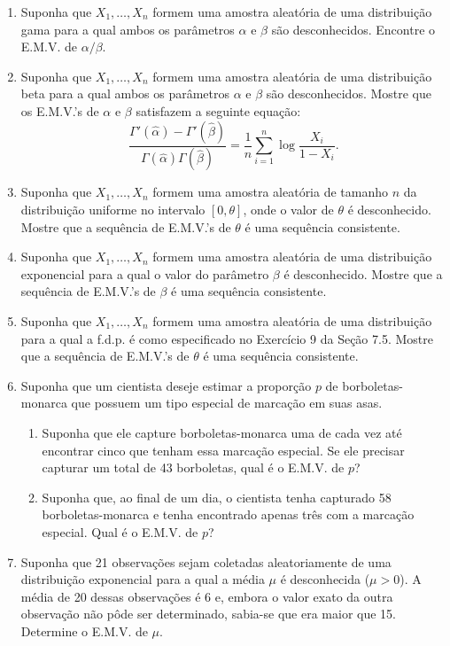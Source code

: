 \begin{enumerate}
    \item Suponha que $X_1, \dots, X_n$ formem uma amostra aleatória de uma distribuição gama para a qual ambos os parâmetros $\alpha$ e $\beta$ são desconhecidos. Encontre o E.M.V. de $\alpha/\beta$.
    
    \item Suponha que $X_1, \dots, X_n$ formem uma amostra aleatória de uma distribuição beta para a qual ambos os parâmetros $\alpha$ e $\beta$ são desconhecidos. Mostre que os E.M.V.'s de $\alpha$ e $\beta$ satisfazem a seguinte equação:
    $$ \frac{\Gamma'(\hat{\alpha}) - \Gamma'(\hat{\beta})}{\Gamma(\hat{\alpha})\Gamma(\hat{\beta})} = \frac{1}{n}\sum_{i=1}^{n} \log\frac{X_i}{1-X_i}. $$
    
    \item Suponha que $X_1, \dots, X_n$ formem uma amostra aleatória de tamanho $n$ da distribuição uniforme no intervalo $[0, \theta]$, onde o valor de $\theta$ é desconhecido. Mostre que a sequência de E.M.V.'s de $\theta$ é uma sequência consistente.
    
    \item Suponha que $X_1, \dots, X_n$ formem uma amostra aleatória de uma distribuição exponencial para a qual o valor do parâmetro $\beta$ é desconhecido. Mostre que a sequência de E.M.V.'s de $\beta$ é uma sequência consistente.
    
    \item Suponha que $X_1, \dots, X_n$ formem uma amostra aleatória de uma distribuição para a qual a f.d.p. é como especificado no Exercício 9 da Seção 7.5. Mostre que a sequência de E.M.V.'s de $\theta$ é uma sequência consistente.
    
    \item Suponha que um cientista deseje estimar a proporção $p$ de borboletas-monarca que possuem um tipo especial de marcação em suas asas.
    \begin{enumerate}
        \item Suponha que ele capture borboletas-monarca uma de cada vez até encontrar cinco que tenham essa marcação especial. Se ele precisar capturar um total de 43 borboletas, qual é o E.M.V. de $p$?
        \item Suponha que, ao final de um dia, o cientista tenha capturado 58 borboletas-monarca e tenha encontrado apenas três com a marcação especial. Qual é o E.M.V. de $p$?
    \end{enumerate}
    
    \item Suponha que 21 observações sejam coletadas aleatoriamente de uma distribuição exponencial para a qual a média $\mu$ é desconhecida ($\mu > 0$). A média de 20 dessas observações é 6 e, embora o valor exato da outra observação não pôde ser determinado, sabia-se que era maior que 15. Determine o E.M.V. de $\mu$.
    

\end{enumerate}
